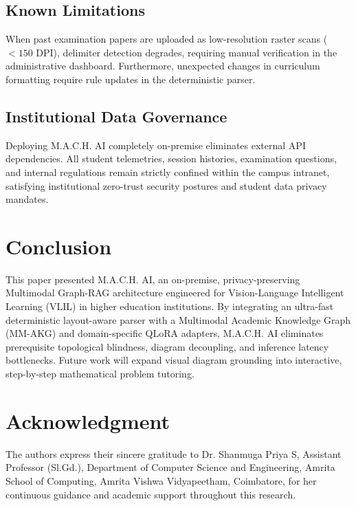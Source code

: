 \documentclass[conference]{IEEEtran}
\begin{document}
\subsection{Known Limitations}
When past examination papers are uploaded as low-resolution raster scans ($<150$ DPI), delimiter detection degrades, requiring manual verification in the administrative dashboard. Furthermore, unexpected changes in curriculum formatting require rule updates in the deterministic parser.

\subsection{Institutional Data Governance}
Deploying M.A.C.H. AI completely on-premise eliminates external API dependencies. All student telemetries, session histories, examination questions, and internal regulations remain strictly confined within the campus intranet, satisfying institutional zero-trust security postures and student data privacy mandates.

\section{Conclusion}
This paper presented M.A.C.H. AI, an on-premise, privacy-preserving Multimodal Graph-RAG architecture engineered for Vision-Language Intelligent Learning (VLIL) in higher education institutions. By integrating an ultra-fast deterministic layout-aware parser with a Multimodal Academic Knowledge Graph (MM-AKG) and domain-specific QLoRA adapters, M.A.C.H. AI eliminates prerequisite topological blindness, diagram decoupling, and inference latency bottlenecks. Future work will expand visual diagram grounding into interactive, step-by-step mathematical problem tutoring.

\balance
\section*{Acknowledgment}
The authors express their sincere gratitude to Dr. Shanmuga Priya S, Assistant Professor (Sl.Gd.), Department of Computer Science and Engineering, Amrita School of Computing, Amrita Vishwa Vidyapeetham, Coimbatore, for her continuous guidance and academic support throughout this research.



\end{document}
